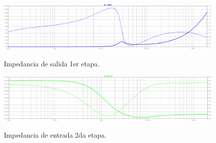 \begin{figure}[H]
	\centering
	\includegraphics[width=\textwidth]{Imagenes-Ej2/ZoutE1.png}
	\label{fig:graph}
	\caption{Impedancia de salida 1er etapa.}
\end{figure}


\begin{figure}[H]
	\centering
	\includegraphics[width=\textwidth]{Imagenes-Ej2/ZinE2.png}
	\label{fig:graph}
	\caption{Impedancia de entrada 2da etapa.}
\end{figure}

